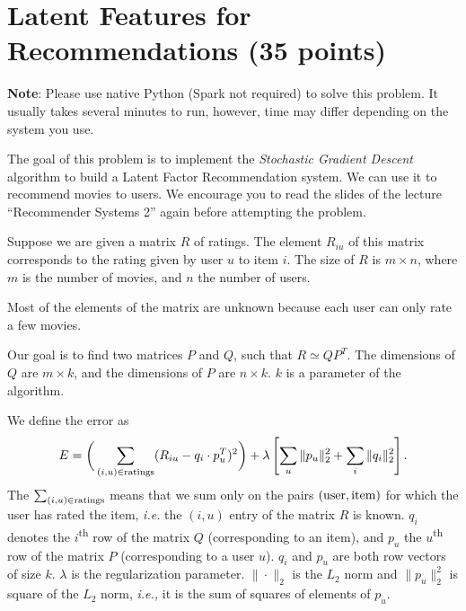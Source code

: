 \section{Latent Features for Recommendations (35 points) }

\textbf{Note}: Please use native Python (Spark not required) to solve this problem. It usually takes several minutes to run, however, time may differ depending on the system you use.

\begin{center}
	{\footnotesize {} \hspace{1em}  \hspace{1em} }
\end{center}
The goal of this problem is to implement the \textit{Stochastic Gradient Descent} algorithm to
build a Latent Factor Recommendation system. We can use it to
recommend movies to users. We encourage you to  read the slides of the lecture
``Recommender Systems 2'' again before attempting the problem.

Suppose we are given a matrix $R$ of ratings. The element $R_{iu}$
of this matrix corresponds to the rating given by user $u$ to item $i$. The size of $R$ is $m\times n$, where $m$ is the number of movies, and $n$ the number of users.

Most of the elements of the matrix are unknown because each user can only rate a few movies. 

Our goal is to find two matrices $P$ and $Q$, such that $R \simeq QP^T$. The dimensions of $Q$ are $m \times k$, and the dimensions of $P$ are $n \times k$. $k$ is a parameter of the algorithm.

We define the error as
\begin{equation}
	E = \bigg(\sum_{(i,u) \in \textnormal{ratings}} (R_{iu} - q_i\cdot p_u^{T})^2\bigg) + \lambda
\left[\sum_u\|p_u\|_{2}^{2} + \sum_i\|q_i\|_{2}^{2}\right].
\label{eq:rec}
\end{equation}
The $\sum_{(i,u) \in \textnormal{ratings}}$ means that we sum only on the pairs
$(\textnormal{user},\textnormal{item})$ for which the user has rated the item, \emph{i.e.} the $(i,u)$ entry of the matrix $R$ is known.  $q_i$ denotes the $i$\textsuperscript{th} row of the matrix $Q$ (corresponding to an item), and $p_u$ the $u$\textsuperscript{th} row of the matrix $P$ (corresponding to a user $u$). $q_i$ and $p_u$ are both row vectors of size $k$. $\lambda$ is the regularization parameter. $\|\cdot\|_{2}$ is the $L_2$ norm and
$\|p_u\|_{2}^{2}$ is square of the $L_2$ norm, \emph{i.e.,} it is the sum of squares of elements of $p_u$.


